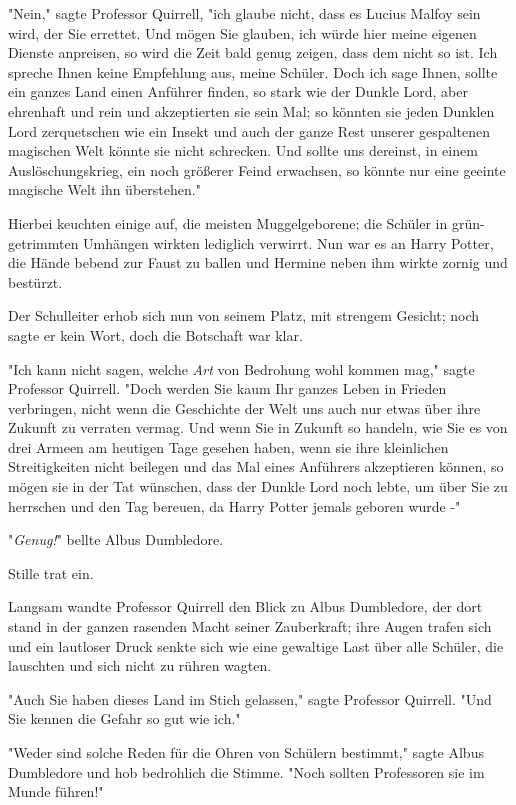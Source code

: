 {"Nein," sagte Professor Quirrell, "ich glaube nicht, dass es Lucius Malfoy sein wird, der Sie errettet. Und mögen Sie glauben, ich würde hier meine eigenen Dienste anpreisen, so wird die Zeit bald genug zeigen, dass dem nicht so ist. Ich spreche Ihnen keine Empfehlung aus, meine Schüler. Doch ich sage Ihnen, sollte ein ganzes Land einen Anführer finden, so stark wie der Dunkle Lord, aber ehrenhaft und rein und akzeptierten sie sein Mal; so könnten sie jeden Dunklen Lord zerquetschen wie ein Insekt und auch der ganze Rest unserer gespaltenen magischen Welt könnte sie nicht schrecken. Und sollte uns dereinst, in einem Auslöschungskrieg, ein noch größerer Feind erwachsen, so könnte nur eine geeinte magische Welt ihn überstehen."

Hierbei keuchten einige auf, die meisten Muggelgeborene; die Schüler in grün-getrimmten Umhängen wirkten lediglich verwirrt. Nun war es an Harry Potter, die Hände bebend zur Faust zu ballen und Hermine neben ihm wirkte zornig und bestürzt.

Der Schulleiter erhob sich nun von seinem Platz, mit strengem Gesicht; noch sagte er kein Wort, doch die Botschaft war klar.

"Ich kann nicht sagen, welche \emph{Art} von Bedrohung wohl kommen mag," sagte Professor Quirrell. "Doch werden Sie kaum Ihr ganzes Leben in Frieden verbringen, nicht wenn die Geschichte der Welt uns auch nur etwas über ihre Zukunft zu verraten vermag. Und wenn Sie in Zukunft so handeln, wie Sie es von drei Armeen am heutigen Tage gesehen haben, wenn sie ihre kleinlichen Streitigkeiten nicht beilegen und das Mal eines Anführers akzeptieren können, so mögen sie in der Tat wünschen, dass der Dunkle Lord noch lebte, um über Sie zu herrschen und den Tag bereuen, da Harry Potter jemals geboren wurde -"

"\emph{Genug!}" bellte Albus Dumbledore.

Stille trat ein.

Langsam wandte Professor Quirrell den Blick zu Albus Dumbledore, der dort stand in der ganzen rasenden Macht seiner Zauberkraft; ihre Augen trafen sich und ein lautloser Druck senkte sich wie eine gewaltige Last über alle Schüler, die lauschten und sich nicht zu rühren wagten.

"Auch Sie haben dieses Land im Stich gelassen," sagte Professor Quirrell. "Und Sie kennen die Gefahr so gut wie ich."

"Weder sind solche Reden für die Ohren von Schülern bestimmt," sagte Albus Dumbledore und hob bedrohlich die Stimme. "Noch sollten Professoren sie im Munde führen!"

}
